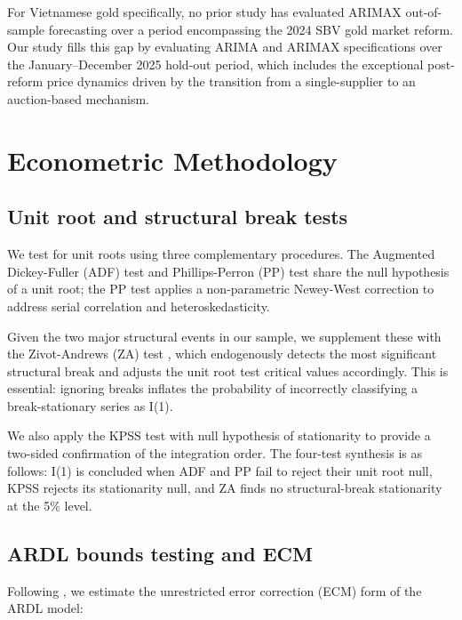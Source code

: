 \documentclass[12pt,a4paper]{article}
\begin{document}
For Vietnamese gold specifically, no prior study has evaluated ARIMAX
out-of-sample forecasting over a period encompassing the 2024 SBV
gold market reform. Our study fills this gap by evaluating ARIMA and
ARIMAX specifications over the January--December 2025 hold-out period,
which includes the exceptional post-reform price dynamics driven by the
transition from a single-supplier to an auction-based mechanism.

\section{Econometric Methodology}
\label{sec:method}

\subsection{Unit root and structural break tests}

We test for unit roots using three complementary procedures.
The Augmented Dickey-Fuller (ADF) test \citep{dickey1981} and
Phillips-Perron (PP) test \citep{phillips1988} share the null hypothesis
of a unit root; the PP test applies a non-parametric Newey-West correction
to address serial correlation and heteroskedasticity.

Given the two major structural events in our sample, we supplement these
with the Zivot-Andrews (ZA) test \citep{zivot1992}, which endogenously
detects the most significant structural break and adjusts the unit root
test critical values accordingly. This is essential: ignoring breaks
inflates the probability of incorrectly classifying a break-stationary
series as I(1).

We also apply the KPSS test \citep{kwiatkowski1992} with null hypothesis
of stationarity to provide a two-sided confirmation of the integration order.
The four-test synthesis is as follows: I(1) is concluded when ADF and PP
fail to reject their unit root null, KPSS rejects its stationarity null,
and ZA finds no structural-break stationarity at the 5\% level.

\subsection{ARDL bounds testing and ECM}

Following \citet{pesaran2001}, we estimate the unrestricted error correction
(ECM) form of the ARDL model:
\end{document}

